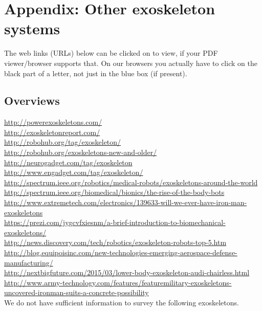 
\section{Appendix: Other exoskeleton systems}

The web links (URLs) below can be clicked on to view, if your PDF viewer/browser supports that.
On our browsers you actually have to click on the black
part of a letter, not just in the blue box (if present).

\subsection{Overviews}

\url{http://powerexoskeletons.com/}\\
\url{http://exoskeletonreport.com/}\\
\url{http://robohub.org/tag/exoskeleton/}\\
\url{http://robohub.org/exoskeletons-new-and-older/}\\
\url{http://neurogadget.com/tag/exoskeleton}\\
\url{http://www.engadget.com/tag/exoskeleton/}\\
\url{http://spectrum.ieee.org/robotics/medical-robots/exoskeletons-around-the-world}\\
\url{http://spectrum.ieee.org/biomedical/bionics/the-rise-of-the-body-bots}\\
\url{http://www.extremetech.com/electronics/139633-will-we-ever-have-iron-man-exoskeletons}\\
\url{https://prezi.com/jygcvfxiesnm/a-brief-introduction-to-biomechanical-exoskeletons/}\\
\url{http://news.discovery.com/tech/robotics/exoskeleton-robots-top-5.htm}\\
\url{http://blog.equipoisinc.com/new-technologies-emerging-aerospace-defense-manufacturing/}\\
\url{http://nextbigfuture.com/2015/03/lower-body-exoskeleton-audi-chairless.html}\\
\url{http://www.army-technology.com/features/featuremilitary-exoskeletons-uncovered-ironman-suits-a-concrete-possibility}\\


We do not have sufficient information to survey the following exoskeletons.

